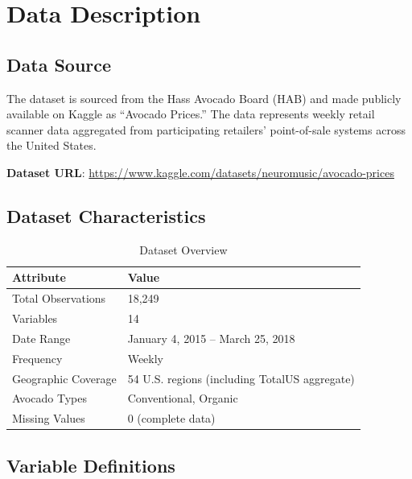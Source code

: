 \documentclass[12pt]{article}
\begin{document}
\newpage

\section{Data Description}
\label{sec:data}

\subsection{Data Source}

The dataset is sourced from the Hass Avocado Board (HAB) and made publicly available on Kaggle as ``Avocado Prices.'' The data represents weekly retail scanner data aggregated from participating retailers' point-of-sale systems across the United States.

\textbf{Dataset URL}: \url{https://www.kaggle.com/datasets/neuromusic/avocado-prices}

\subsection{Dataset Characteristics}

\begin{table}[H]
\centering
\caption{Dataset Overview}
\begin{tabular}{ll}
\toprule
\textbf{Attribute} & \textbf{Value} \\
\midrule
Total Observations & 18,249 \\
Variables & 14 \\
Date Range & January 4, 2015 -- March 25, 2018 \\
Frequency & Weekly \\
Geographic Coverage & 54 U.S. regions (including TotalUS aggregate) \\
Avocado Types & Conventional, Organic \\
Missing Values & 0 (complete data) \\
\bottomrule
\end{tabular}
\end{table}

\subsection{Variable Definitions}
\end{document}
